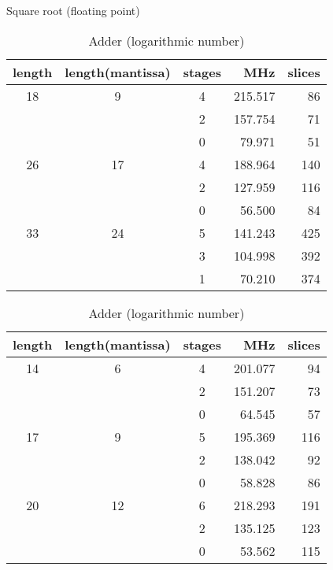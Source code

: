 \documentclass{llncs}
\begin{document}
\begin{table}
  \begin{center}
    \begin{minipage}{.45\linewidth}
      \caption{Square root (floating point)}
      \begin{center}
	\begin{tabular}{cccrr}
	  \hline
	  \hline
	  length  & length(mantissa) & stages & MHz & slices\\
	  \hline
	  18   &  9 & 4 & 215.517 & 86 \\
	  &    & 2 & 157.754 & 71 \\
	  &    & 0 &  79.971 & 51 \\
	  \hline
	  26   & 17 & 4 & 188.964 & 140 \\
	  &    & 2 & 127.959 & 116 \\
	  &    & 0 &  56.500 &  84 \\
	  \hline
	  33   & 24 & 5 & 141.243 & 425 \\
	  &    & 3 & 104.998 & 392 \\
	  &    & 1 &  70.210 & 374 \\
	  \hline
	  \hline
	\end{tabular}
      \end{center}
      \label{tabpg_float_sqrt}
    \end{minipage}
    \hspace{2.4pc}
    \begin{minipage}{.45\linewidth}
      \caption{Adder (logarithmic number)}
      \begin{center}
	\begin{tabular}{cccrr}
	  \hline
	  \hline
	  length  & length(mantissa) & stages & MHz & slices\\
	  \hline
	  14   &  6 & 4 & 201.077 & 94 \\
	  &    & 2 & 151.207 & 73 \\
	  &    & 0 &  64.545 & 57 \\
	  \hline
	  17   &  9 & 5 & 195.369 & 116 \\
	  &    & 2 & 138.042 &  92 \\
	  &    & 0 &  58.828 &  86 \\
	  \hline
	  20   & 12 & 6 & 218.293 & 191 \\
	  &    & 2 & 135.125 & 123 \\
	  &    & 0 &  53.562 & 115 \\
	  \hline
	  \hline
	\end{tabular}
      \end{center}
      \label{tabpg_log_unsigned_add}
    \end{minipage}
  \end{center}
\end{table}
\end{document}
